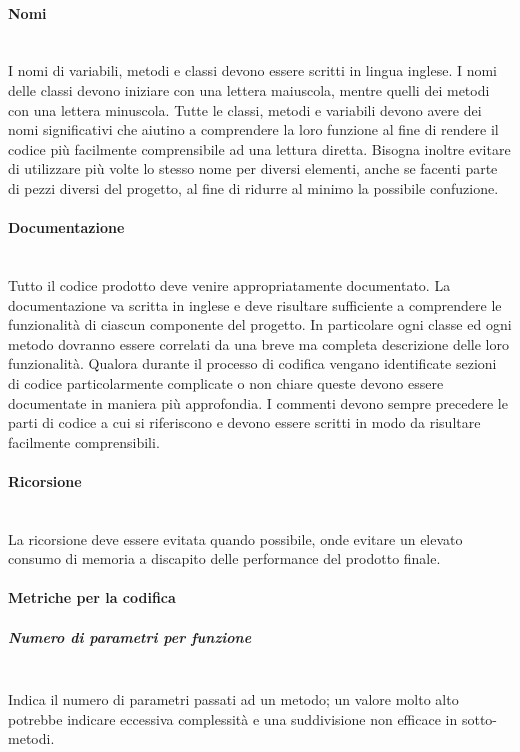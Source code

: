 \paragraph{Nomi}\label{sec:nomi}\mbox{}\\
I nomi di variabili, metodi e classi devono essere scritti in lingua inglese. I nomi delle classi devono iniziare con una lettera maiuscola, mentre quelli dei metodi con una lettera minuscola. Tutte le classi, metodi e variabili devono avere dei nomi significativi che aiutino a comprendere la loro funzione al fine di rendere il codice più facilmente comprensibile ad una lettura diretta. Bisogna inoltre evitare di utilizzare più volte lo stesso nome per diversi elementi, anche se facenti parte di pezzi diversi del progetto, al fine di ridurre al minimo la possibile confuzione.

\paragraph{Documentazione}\label{sec:documentazione}\mbox{}\\
Tutto il codice prodotto deve venire appropriatamente documentato. La documentazione va scritta in inglese e deve risultare sufficiente a comprendere le funzionalità di ciascun componente del progetto. In particolare ogni classe ed ogni metodo dovranno essere correlati da una breve ma completa descrizione delle loro funzionalità. Qualora durante il processo di codifica vengano identificate sezioni di codice particolarmente complicate o non chiare queste devono essere documentate in maniera più approfondia. I commenti devono sempre precedere le parti di codice a cui si riferiscono e devono essere scritti in modo da risultare facilmente comprensibili.

\paragraph{Ricorsione}\mbox{}\\
La ricorsione deve essere evitata quando possibile, onde evitare un elevato consumo di memoria a discapito delle performance del prodotto finale.

\paragraph{Metriche per la codifica}\mbox{}
\subparagraph{Numero di parametri per funzione}\mbox{}\\
Indica il numero di parametri passati ad un metodo; un valore molto alto potrebbe indicare eccessiva complessità e una suddivisione non efficace in sotto-metodi.

